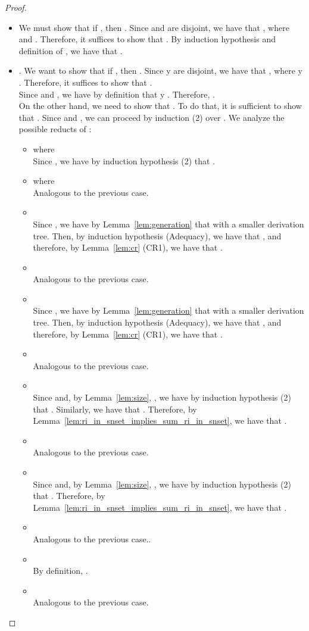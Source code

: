 \documentclass[preprint]{elsarticle}
\begin{document}
\begin{proof}
\begin{itemize}
  \item  We must show that if , then .
    Since  and  are disjoint, we have that , where  and .
    Therefore, it suffices to show that .
    By induction hypothesis and definition of , we have that .

  \item . We want to show that if , then .
    Since  y  are disjoint, we have that , where  y .
    Therefore, it suffices to show that .
    \\ Since  and , we have by definition that  y . Therefore, .
    \\ On the other hand, we need to show that . To do that, it is sufficient to show that . Since  and , we can proceed by induction (2) over . We analyze the possible reducts of :
    \begin{itemize}
    \item  where 
      \\ Since , we have by induction hypothesis (2) that .
    \item  where 
      \\ Analogous to the previous case.
    \item 
      \\ Since , we have by Lemma~\ref{lem:generation}  that  with a smaller derivation tree. Then, by induction hypothesis (Adequacy), we have that , and therefore, by Lemma~\ref{lem:cr} (CR1), we have that .
    \item 
      \\ Analogous to the previous case.
    \item 
      \\ Since , we have by Lemma~\ref{lem:generation}  that  with a smaller derivation tree. Then, by induction hypothesis (Adequacy), we have that , and therefore, by Lemma~\ref{lem:cr} (CR1), we have that .
    \item 
      \\ Analogous to the previous case.
    \item 
      \\ Since  and, by Lemma~\ref{lem:size}, , we have by induction hypothesis (2) that . Similarly, we have that . Therefore, by Lemma~\ref{lem:ri_in_snset_implies_sum_ri_in_snset}, we have that .
    \item 
      \\ Analogous to the previous case.
    \item 
      \\ Since  and, by Lemma~\ref{lem:size}, , we have by induction hypothesis (2) that . Therefore, by Lemma~\ref{lem:ri_in_snset_implies_sum_ri_in_snset}, we have that .
    \item 
      \\ Analogous to the previous case..
    \item 
      \\ By definition, .
    \item 
      \\ Analogous to the previous case.
    \end{itemize}



\end{itemize}
\end{proof}
\end{document}
